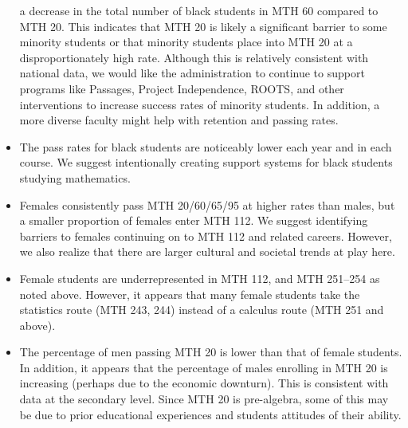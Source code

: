 \begin{itemize}
      a decrease in the total number of black students in MTH 60 compared to
      MTH 20. This indicates that MTH 20 is likely a significant barrier to
      some minority students or that minority students place into MTH 20 at a
      disproportionately high rate. Although this is relatively consistent with
      national data, we would like the administration to continue to support
      programs like Passages, Project Independence, ROOTS, and other interventions 
      to increase success rates of
      minority students. In addition, a more diverse faculty might help with
      retention and passing rates.
    \item The pass rates for black students are noticeably lower each year and
      in each course. We suggest intentionally creating support systems for
      black students studying mathematics.
    \item Females consistently pass MTH 20/60/65/95 at higher rates than males,
      but a smaller proportion of females enter MTH 112. We suggest identifying
      barriers to females continuing on to MTH 112 and related careers.
      However, we also realize that there are larger cultural and societal
      trends at play here.
    \item Female students are underrepresented in MTH 112, and MTH 251--254 as
      noted above. However, it appears that many female students take the
      statistics route (MTH 243, 244) instead of a calculus route (MTH 251 and above).
    \item The percentage of men passing MTH 20 is lower than that of female
      students. In addition, it appears that the percentage of males enrolling
      in MTH 20 is increasing (perhaps due to the economic downturn). This is
      consistent with data at the secondary level. Since MTH 20 is pre-algebra,
      some of this may be due to prior educational experiences and students
      attitudes of their ability.
\end{itemize}

